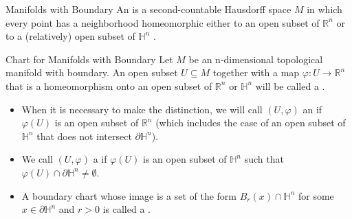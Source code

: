 \documentclass[../main.tex]{subfiles}
\begin{document}
\begin{definition}{Manifolds with Boundary}{}
    An  is a second-countable Hausdorff space $M$ in which every point has a neighborhood homeomorphic either to an open subset of $\mathbb{R}^n$ or to a (relatively) open subset of $\mathbb{H}^n$ .
  
\end{definition}
\begin{definition}{Chart for Manifolds with Boundary}{}
   Let \(  M  \) be an n-dimensional topological manifold with boundary.  An open subset $U \subseteq M$ together with a map $\varphi : U \to \mathbb{R}^n$ that is a homeomorphism onto an open subset of $\mathbb{R}^n$ or $\mathbb{H}^n$ will be called a .
        \begin{itemize}
            \item  When it is necessary to make the distinction, we will call $(U,\varphi)$ an  if $\varphi(U)$ is an open subset of $\mathbb{R}^n$ (which includes the case of an open subset of $\mathbb{H}^n$ that does not intersect $\partial\mathbb{H}^n$). 
            \item We call \(  \left( U, \varphi  \right)   \) a  if $\varphi(U)$ is an open subset of $\mathbb{H}^n$ such that $\varphi(U) \cap \partial\mathbb{H}^n \neq \emptyset$. 
            \item A boundary chart whose image is a set of the form $B_r(x) \cap \mathbb{H}^n$ for some $x \in \partial\mathbb{H}^n$ and $r > 0$ is called a .
        \end{itemize}
\end{definition}
\end{document}
